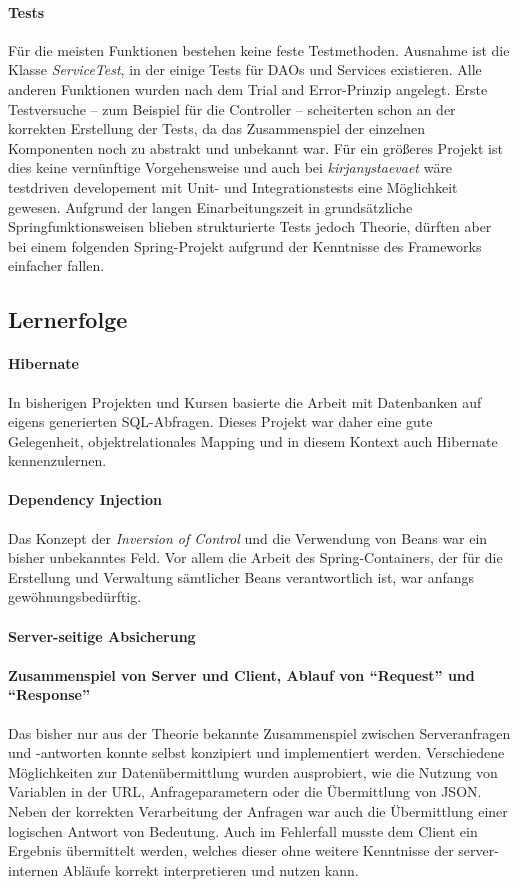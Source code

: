 		\paragraph{Tests} Für die meisten Funktionen bestehen keine feste Testmethoden. Ausnahme ist die Klasse \textit{ServiceTest}, in der einige Tests für DAOs und Services existieren. Alle anderen Funktionen wurden nach dem Trial and Error-Prinzip angelegt. Erste Testversuche -- zum Beispiel für die Controller -- scheiterten schon an der korrekten Erstellung der Tests, da das Zusammenspiel der einzelnen Komponenten noch zu abstrakt und unbekannt war. Für ein größeres Projekt ist dies keine vernünftige Vorgehensweise und auch bei \textit{kirjanystaevaet} wäre testdriven developement mit Unit- und Integrationstests eine Möglichkeit gewesen. Aufgrund der langen Einarbeitungszeit in grundsätzliche Springfunktionsweisen blieben strukturierte Tests jedoch Theorie, dürften aber bei einem folgenden Spring-Projekt aufgrund der Kenntnisse des Frameworks einfacher fallen.

	\subsection{Lernerfolge}
		\paragraph{Hibernate} In bisherigen Projekten und Kursen basierte die Arbeit mit Datenbanken auf eigens generierten SQL-Abfragen. Dieses Projekt war daher eine gute Gelegenheit, objektrelationales Mapping und in diesem Kontext auch Hibernate kennenzulernen.
		
		\paragraph{Dependency Injection} Das Konzept der \textit{Inversion of Control} und die Verwendung von Beans war ein bisher unbekanntes Feld. Vor allem die Arbeit des Spring-Containers, der für die Erstellung und Verwaltung sämtlicher Beans verantwortlich ist, war anfangs gewöhnungsbedürftig.
		
		\paragraph{Server-seitige Absicherung}
		
		\paragraph{Zusammenspiel von Server und Client, Ablauf von "`Request"' und "`Response"'}
		Das bisher nur aus der Theorie bekannte Zusammenspiel zwischen Serveranfragen und -antworten konnte selbst konzipiert und implementiert werden. Verschiedene Möglichkeiten zur Datenübermittlung wurden ausprobiert, wie die Nutzung von Variablen in der URL, Anfrageparametern oder die Übermittlung von JSON. Neben der korrekten Verarbeitung der Anfragen war auch die Übermittlung einer logischen Antwort von Bedeutung. Auch im Fehlerfall musste dem Client ein Ergebnis übermittelt werden, welches dieser ohne weitere Kenntnisse der server-internen Abläufe korrekt interpretieren und nutzen kann.
		
